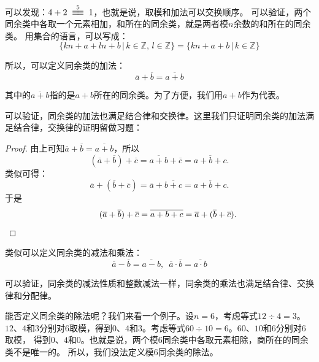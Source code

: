 \documentclass[12pt,UTF8,fontset=none]{ctexbook}
\begin{document}
可以发现：$ 4 + 2 \tong{5} 1$，也就是说，取模和加法可以交换顺序。
可以验证，两个同余类中各取一个元素相加，和所在的同余类，就是两者模$n$余数的和所在的同余类。
用集合的语言，可以写成：
$$\{kn + a + ln + b \, | \, k\in\mathbb{Z}, \, l\in\mathbb{Z} \} = \{kn + a + b \, | \, k\in\mathbb{Z} \}$$

所以，可以定义同余类的加法：
$$ \overline{a} + \overline{b} = \overline{a + b}$$

其中的$\overline{a + b}$指的是$a+b$所在的同余类。为了方便，我们用$a + b$作为代表。

可以验证，同余类的加法也满足结合律和交换律。这里我们只证明同余类的加法满足结合律，交换律的证明留做习题：

\begin{proof}
    由上可知$ \overline{a} + \overline{b} = \overline{a + b}$，所以
    $$ (\overline{a} + \overline{b}) + \overline{c} = \overline{a + b}+ \overline{c} = \overline{a + b + c}.$$
    类似可得：
    $$ \overline{a} + (\overline{b} + \overline{c}) = \overline{a}+ \overline{b + c} = \overline{a + b + c}.$$
    于是
    $$ \quad \quad \quad (\overline{a} + \overline{b}) + \overline{c}  = \overline{a + b + c} = \overline{a} + (\overline{b} + \overline{c}). \quad \qedhere$$
\end{proof}

类似可以定义同余类的减法和乘法：
$$ \overline{a} - \overline{b} = \overline{a - b}, \,\,\, \overline{a} \cdot \overline{b} = \overline{a \cdot b}$$

可以验证，同余类的减法性质和整数减法一样，同余类的乘法也满足结合律、交换律和分配律。

能否定义同余类的除法呢？我们来看一个例子。设$n=6$，考虑等式$12 \div 4 = 3$。
$12$、$4$和$3$分别对$6$取模，得到$0$、$4$和$3$。考虑等式$60 \div 10 = 6$。$60$、$10$和$6$分别对$6$取模，
得到$0$、$4$和$0$。也就是说，两个模$6$同余类中各取元素相除，商所在的同余类不是唯一的。
所以，我们没法定义模$6$同余类的除法。
\end{document}
